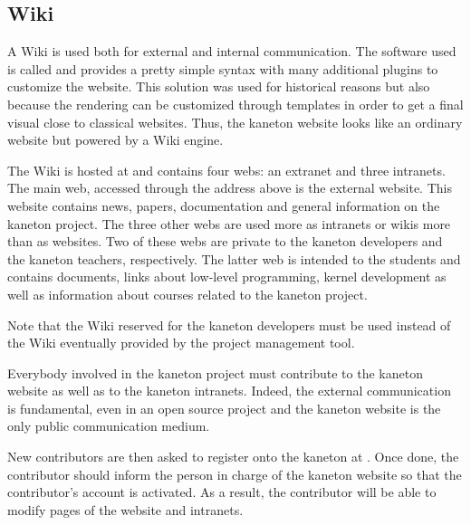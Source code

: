 %
%
%
%
%
%

%
%

\subsection{Wiki}
\label{section:wiki}

A Wiki is used both for external and internal communication. The software
used is called  and provides a pretty simple syntax with
many additional plugins to customize the website. This solution was used
for historical reasons but also because the  rendering can
be customized through templates in order to get a final visual close to
classical websites. Thus, the kaneton website looks like an ordinary
website but powered by a Wiki engine.

The Wiki is hosted at  and contains four
webs: an extranet and three intranets. The main web, accessed through the
address above is the external website. This website contains news, papers,
documentation and general information on the kaneton project. The three other
webs are used more as intranets or wikis more than as websites. Two of these
webs are private to the kaneton developers and the kaneton teachers,
respectively. The latter web is intended to the students and contains
documents, links \etc{} about low-level programming, kernel development \etc{}
as well as information about courses related to the kaneton project.

Note that the Wiki reserved for the kaneton developers must be used
instead of the Wiki eventually provided by the project management tool.

Everybody involved in the kaneton project must contribute to the kaneton
website as well as to the kaneton intranets. Indeed, the external communication
is fundamental, even in an open source project and the kaneton website is
the only public communication medium.

New contributors are then asked to register onto the kaneton 
at . Once done, the contributor should
inform the person in charge of the kaneton website so that  the contributor's
account is activated. As a result, the contributor will be able to modify
pages of the website and intranets.
